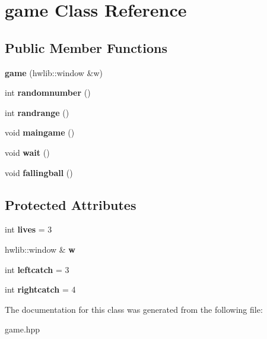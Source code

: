 \hypertarget{classgame}{}\section{game Class Reference}
\label{classgame}
\subsection*{Public Member Functions}
\begin{DoxyCompactItemize}
\item 
\mbox{\label{classgame_aff588a4ad6e3d35af51ded6a57fcece1}} 
{\bfseries game} (hwlib\+::window \&w)
\item 
\mbox{\label{classgame_a800820bf98f85edf559e5f248276d682}} 
int {\bfseries randomnumber} ()
\item 
\mbox{\label{classgame_a22a0a3057afb0d8d0d10660100af352f}} 
int {\bfseries randrange} ()
\item 
\mbox{\label{classgame_a1674d3c5caaad5434016d9a4149e76db}} 
void {\bfseries maingame} ()
\item 
\mbox{\label{classgame_a87d93e049640c7b340eaee127ddf774e}} 
void {\bfseries wait} ()
\item 
\mbox{\label{classgame_a64583d5e372b72e4f1dcd098e887bfa9}} 
void {\bfseries fallingball} ()
\end{DoxyCompactItemize}
\subsection*{Protected Attributes}
\begin{DoxyCompactItemize}
\item 
\mbox{\label{classgame_a0fb92d1b79c27c3aa9d008eb88d42939}} 
int {\bfseries lives} = 3
\item 
\mbox{\label{classgame_a50511c72d0519145d9f62705324a1000}} 
hwlib\+::window \& {\bfseries w}
\item 
\mbox{\label{classgame_a9f0e8003fb2cd4ed09718f773b6bcce6}} 
int {\bfseries leftcatch} = 3
\item 
\mbox{\label{classgame_ae32e63234b3eb64d9b04f73d0f44e789}} 
int {\bfseries rightcatch} = 4
\end{DoxyCompactItemize}


The documentation for this class was generated from the following file\+:\begin{DoxyCompactItemize}
\item 
game.\+hpp\end{DoxyCompactItemize}
